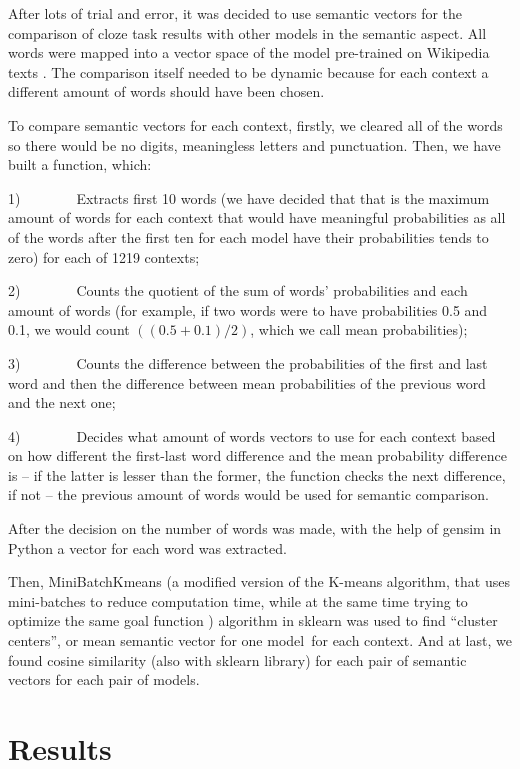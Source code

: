 \documentclass[a4paper]{article}
\begin{document}
After lots of trial and error, it was decided to use semantic vectors for the comparison of cloze task results with other models in the semantic aspect. All words were mapped into a vector space of the model pre-trained on Wikipedia texts \cite{arefyev}. The comparison itself needed to be dynamic because for each context a different amount of words should have been chosen.

To compare semantic vectors for each context, firstly, we cleared all of the words so there would be no digits, meaningless letters and punctuation. Then, we have built a function, which:

1)        Extracts first 10 words (we have decided that that is the maximum amount of words for each context that would have meaningful probabilities as all of the words after the first ten for each model have their probabilities tends to zero) for each of 1219 contexts;

2)        Counts the quotient of the sum of words’ probabilities and each amount of words (for example, if two words were to have probabilities 0.5 and 0.1, we would count $((0.5+0.1)/2)$, which we call mean probabilities);

3)        Counts the difference between the probabilities of the first and last word and then the difference between mean probabilities of the previous word and the next one;

4)        Decides what amount of words vectors to use for each context based on how different the first-last word difference and the mean probability difference is – if the latter is lesser than the former, the function checks the next difference, if not – the previous amount of words would be used for semantic comparison.

After the decision on the number of words was made, with the help of gensim in Python a vector for each word was extracted.

Then, MiniBatchKmeans (a modified version of the K-means algorithm,
that uses mini-batches to reduce computation time, while at the same
time trying to optimize the same goal function \cite{bejar}) algorithm in sklearn was used to find “cluster centers”, or mean semantic vector for one model for each context. And at last, we found cosine similarity (also with sklearn library) for each pair of semantic vectors for each pair of models.

\section{Results}
\end{document}
